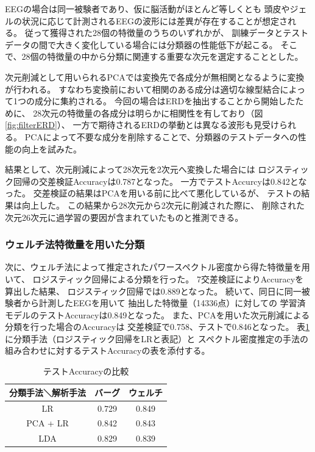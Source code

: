 EEGの場合は同一被験者であり、仮に脳活動がほとんど等しくとも
頭皮やジェルの状況に応じて計測されるEEGの波形には差異が存在することが想定される。
従って獲得された28個の特徴量のうちのいずれかが、
訓練データとテストデータの間で大きく変化している場合には分類器の性能低下が起こる。
そこで、28個の特徴量の中から分類に関連する重要な次元を選定することとした。

次元削減として用いられるPCAでは変換先で各成分が無相関となるように変換が行われる。
すなわち変換前において相関のある成分は適切な線型結合によって1つの成分に集約される。
今回の場合はERDを抽出することから開始したために、
28次元の特徴量の各成分は明らかに相関性を有しており（図\ref{fig:filterERD}）、
一方で期待されるERDの挙動とは異なる波形も見受けられる。
PCAによって不要な成分を削除することで、分類器のテストデータへの性能の向上を試みた。

結果として、次元削減によって28次元を2次元へ変換した場合には
ロジスティック回帰の交差検証Accuracyは0.787となった。
一方でテストAccurcyは0.842となった。
交差検証の結果はPCAを用いる前に比べて悪化しているが、
テストの結果は向上した。
この結果から28次元から2次元に削減された際に、
削除された次元26次元に過学習の要因が含まれていたものと推測できる。

\subsubsection{\mc ウェルチ法特徴量を用いた分類}
次に、ウェルチ法によって推定されたパワースペクトル密度から得た特徴量を用いて、
ロジスティック回帰による分類を行った。
7交差検証によりAccuracyを算出した結果、
ロジスティック回帰では0.889となった。
続いて、同日に同一被験者から計測したEEGを用いて
抽出した特徴量（14336点）に対しての
学習済モデルのテストAccuracyは0.849となった。
また、PCAを用いた次元削減による分類を行った場合のAccuracyは
交差検証で0.758、テストで0.846となった。
表\ref{table:meanacc}に分類手法（ロジスティック回帰をLRと表記）と
スペクトル密度推定の手法の組み合わせに対するテストAccuracyの表を添付する。

\begin{table}[t]
\centering
\caption{テストAccuracyの比較}
    \begin{tabular}{|c|c|c|} \hline
        分類手法＼解析手法 & バーグ & ウェルチ \\ \hline
        LR &  0.729  & 0.849  \\ \hline
        PCA + LR & 0.842  & 0.843  \\  \hline
        LDA & 0.829  & 0.839  \\  \hline
    \end{tabular}
    \label{table:meanacc}
\end{table}

